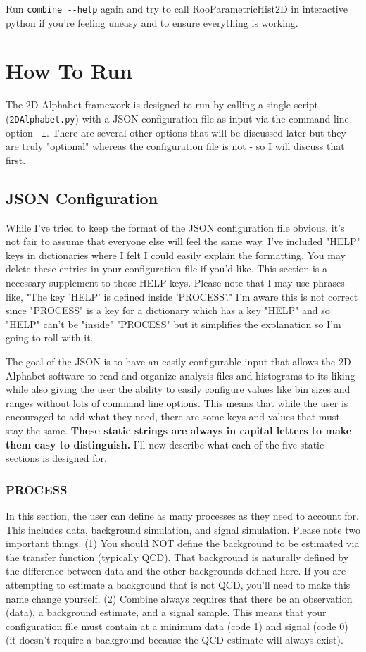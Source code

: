 \documentclass[letter]{article}
\begin{document}
    Run \verb"combine --help" again and try to call RooParametricHist2D in interactive python if you're feeling uneasy and to ensure everything is working. 

\section{How To Run}
    The 2D Alphabet framework is designed to run by calling a single script (\verb"2DAlphabet.py") with a JSON configuration file as input via the command line option \verb"-i". There are several other options that will be discussed later but they are truly "optional" whereas the configuration file is not - so I will discuss that first.

    \subsection{JSON Configuration}
        While I've tried to keep the format of the JSON configuration file obvious, it's not fair to assume that everyone else will feel the same way. I've included "HELP" keys in dictionaries where I felt I could easily explain the formatting. You may delete these entries in your configuration file if you'd like. This section is a necessary supplement to those HELP keys. Please note that I may use phrases like, "The key 'HELP' is defined inside 'PROCESS'." I'm aware this is not correct since "PROCESS" is a key for a dictionary which has a key "HELP" and so "HELP" can't be "inside" "PROCESS" but it simplifies the explanation so I'm going to roll with it.  

        The goal of the JSON is to have an easily configurable input that allows the 2D Alphabet software to read and organize analysis files and histograms to its liking while also giving the user the ability to easily configure values like bin sizes and ranges without lots of command line options. This means that while the user is encouraged to add what they need, there are some keys and values that must stay the same. \textbf{These static strings are always in capital letters to make them easy to distinguish.} I'll now describe what each of the five static sections is designed for.

        \subsubsection{PROCESS}
            In this section, the user can define as many processes as they need to account for. This includes data, background simulation, and signal simulation. Please note two important things. (1) You should NOT define the background to be estimated via the transfer function (typically QCD). That background is naturally defined by the difference between data and the other backgrounds defined here. If you are attempting to estimate a background that is not QCD, you'll need to make this name change yourself. (2) Combine always requires that there be an observation (data), a background estimate, and a signal sample. This means that your configuration file must contain at a minimum data (code 1) and signal (code 0) (it doesn't require a background because the QCD estimate will always exist). 
\end{document}
